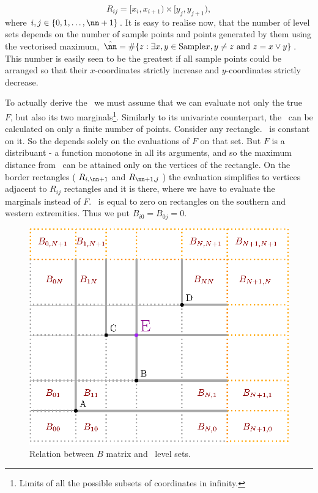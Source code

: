 $$R_{ij} = [x_i, x_{i+1})\times[y_j, y_{j+1}),$$ 
where $i,j \in \{0, 1, \dots, \nn+1 \}$. It is easy to realise now, that the number of level sets depends on the number of sample points and points generated by them using the vectorised maximum, $\hat{\nn} = \# \{ z : \exists x,y \in \text{Sample} x,y \not=z \text{ and } z = x \vee y \}$. This number is easily seen to be the greatest if all sample points could be arranged so that their $x$-coordinates strictly increase and $y$-coordinates strictly decrease.  

To actually derive the \KS\, we must assume that we can evaluate not only the true \cdf\, $F$, but also its two marginals\footnote{Limits of all the possible subsets of coordinates in infinity.}. Similarly to its univariate counterpart, the \KS\, can be calculated on only a finite number of points. Consider any rectangle. \Fecdf\, is constant on it. So the \KS depends solely on the evaluations of $F$ on that set. But $F$ is a distribuant - a function monotone in all its arguments, and so the maximum distance from \Fecdf\, can be attained only on the vertices of the rectangle. On the border rectangles ( $R_{i,\nn+1}$ and $R_{\nn+1,j}$ ) the evaluation simplifies to vertices adjacent to $R_{ij}$ rectangles and it is there, where we have to evaluate the marginals instead of $F$. \Fecdf\, is equal to zero on rectangles on the southern and western extremities. Thus we put $B_{i0} = B_{0j} = 0$. 

\begin{figure}
	\centering \includegraphics[scale=1]{./img/KS2.eps}
	\caption{Relation between $B$ matrix and \ecdf\, level sets.}\label{spaceDivision}
\end{figure}



